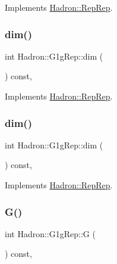 Implements \mbox{\hyperlink{structHadron_1_1RepRep_a92c8802e5ed7afd7da43ccfd5b7cd92b}{Hadron\+::\+Rep\+Rep}}.

\mbox{\label{structHadron_1_1G1gRep_aa6f93ed967ef889de7a9f5aaad48a69b}} 
\subsubsection{\texorpdfstring{dim()}{dim()}\hspace{0.1cm}{\footnotesize\ttfamily [4/5]}}
{\footnotesize\ttfamily int Hadron\+::\+G1g\+Rep\+::dim (\begin{DoxyParamCaption}{ }\end{DoxyParamCaption}) const\hspace{0.3cm}{\ttfamily [inline]}, {\ttfamily [virtual]}}



Implements \mbox{\hyperlink{structHadron_1_1RepRep_a92c8802e5ed7afd7da43ccfd5b7cd92b}{Hadron\+::\+Rep\+Rep}}.

\mbox{\label{structHadron_1_1G1gRep_aa6f93ed967ef889de7a9f5aaad48a69b}} 
\subsubsection{\texorpdfstring{dim()}{dim()}\hspace{0.1cm}{\footnotesize\ttfamily [5/5]}}
{\footnotesize\ttfamily int Hadron\+::\+G1g\+Rep\+::dim (\begin{DoxyParamCaption}{ }\end{DoxyParamCaption}) const\hspace{0.3cm}{\ttfamily [inline]}, {\ttfamily [virtual]}}



Implements \mbox{\hyperlink{structHadron_1_1RepRep_a92c8802e5ed7afd7da43ccfd5b7cd92b}{Hadron\+::\+Rep\+Rep}}.

\mbox{\label{structHadron_1_1G1gRep_aa9607b9bc9fbe4949b3b20273e93add9}} 
\subsubsection{\texorpdfstring{G()}{G()}\hspace{0.1cm}{\footnotesize\ttfamily [1/3]}}
{\footnotesize\ttfamily int Hadron\+::\+G1g\+Rep\+::G (\begin{DoxyParamCaption}{ }\end{DoxyParamCaption}) const\hspace{0.3cm}{\ttfamily [inline]}, {\ttfamily [virtual]}}

